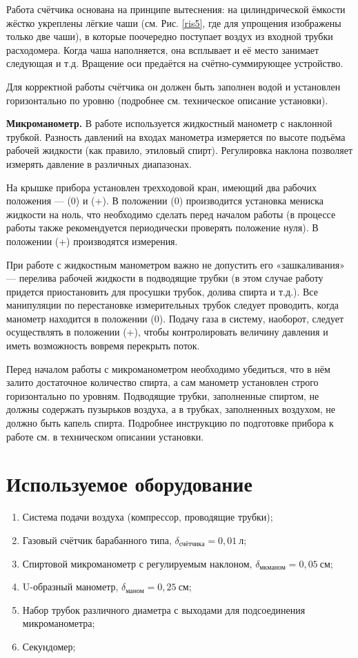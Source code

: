 \documentclass[a4paper, 12pt]{article}
\begin{document}
\par Работа счётчика основана на принципе вытеснения: на цилиндрической ёмкости жёстко укреплены лёгкие чаши (см. Рис. \ref{ris5}, где для
упрощения изображены только две чаши), в которые поочередно поступает воздух из входной трубки расходомера. Когда чаша наполняется, она всплывает и её место занимает следующая и т.д. Вращение оси предаётся на счётно-суммирующее устройство.
\par Для корректной работы счётчика он должен быть заполнен водой и установлен горизонтально по уровню (подробнее см. техническое описание установки).
\par {\bf Микроманометр.} В работе используется жидкостный манометр с наклонной трубкой. Разность давлений на входах манометра измеряется по высоте
подъёма рабочей жидкости (как правило, этиловый спирт). Регулировка
наклона позволяет измерять давление в различных диапазонах.
\par На крышке прибора установлен трехходовой кран, имеющий два рабочих
положения — (0) и (+). В положении (0) производится установка мениска жидкости на ноль, что необходимо сделать перед началом работы (в процессе работы также рекомендуется периодически проверять положение нуля). В положении (+) производятся измерения.
\par При работе с жидкостным манометром важно не допустить его «зашкаливания» — перелива рабочей жидкости в подводящие трубки (в этом случае
работу придется приостановить для просушки трубок, долива спирта и т.д.).
Все манипуляции по перестановке измерительных трубок следует проводить,
когда манометр находится в положении (0). Подачу газа в систему, наоборот,
следует осуществлять в положении (+), чтобы контролировать величину давления и иметь возможность вовремя перекрыть поток.
\par Перед началом работы с микроманометром необходимо убедиться, что в
нём залито достаточное количество спирта, а сам манометр установлен строго
горизонтально по уровням. Подводящие трубки, заполненные спиртом, не
должны содержать пузырьков воздуха, а в трубках, заполненных воздухом, не
должно быть капель спирта. Подробнее инструкцию по подготовке прибора к
работе см. в техническом описании установки.
\section{Используемое оборудование}

\begin{enumerate}
    \item Система подачи воздуха (компрессор, проводящие трубки);
    \item Газовый счётчик барабанного типа,  $\delta_{\text{счётчика}} = 0,01~\text{л}$;
    \item Спиртовой микроманометр с регулируемым наклоном,  $\delta_{\text{мкманом}} = 0,05~\text{см}$;
    \item U-образный манометр,  $\delta_{\text{маном}} = 0,25~\text{см}$;
    \item Набор трубок различного диаметра с выходами для подсоединения микроманометра;
    \item Секундомер;
\end{enumerate}
\end{document}
